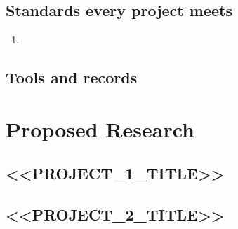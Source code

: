 \documentclass[11pt]{amsart}
\theoremstyle{plain}
\theoremstyle{definition}
\numberwithin{equation}{section}
\begin{document}
\subsection{Standards every project meets}
\begin{enumerate}[leftmargin=*,itemsep=1pt]
\item
\end{enumerate}
\subsection{Tools and records}

\section{Proposed Research}\label{S:proposed}
\subsection{<<PROJECT_1_TITLE>>}\label{S:project1}

\subsection{<<PROJECT_2_TITLE>>}\label{S:project2}
\end{document}

